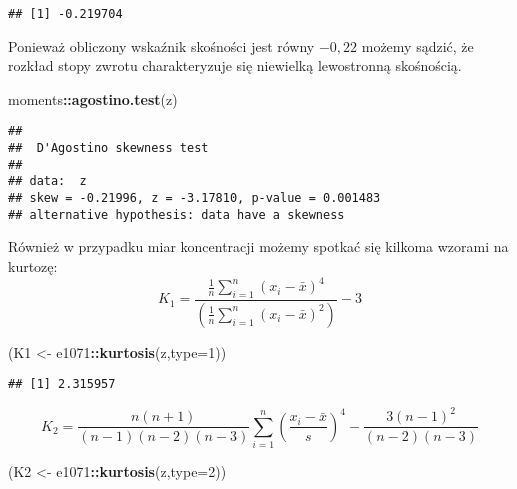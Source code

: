 \documentclass[polish,]{book}
\newenvironment{Shaded}{\begin{snugshade}}{\end{snugshade}}
\newcommand{\DataTypeTok}[1]{\textcolor[rgb]{0.13,0.29,0.53}{#1}}
\newcommand{\DecValTok}[1]{\textcolor[rgb]{0.00,0.00,0.81}{#1}}
\newcommand{\KeywordTok}[1]{\textcolor[rgb]{0.13,0.29,0.53}{\textbf{#1}}}
\newcommand{\NormalTok}[1]{#1}
\newcommand{\OperatorTok}[1]{\textcolor[rgb]{0.81,0.36,0.00}{\textbf{#1}}}
\newcommand{\StringTok}[1]{\textcolor[rgb]{0.31,0.60,0.02}{#1}}
\begin{document}
\begin{verbatim}
## [1] -0.219704
\end{verbatim}

Ponieważ obliczony wskaźnik skośności jest równy \(-0,22\) możemy sądzić, że rozkład stopy zwrotu charakteryzuje się niewielką lewostronną skośnością.

\begin{Shaded}
\begin{Highlighting}[]
\NormalTok{moments}\OperatorTok{::}\KeywordTok{agostino.test}\NormalTok{(z)}
\end{Highlighting}
\end{Shaded}

\begin{verbatim}
## 
##  D'Agostino skewness test
## 
## data:  z
## skew = -0.21996, z = -3.17810, p-value = 0.001483
## alternative hypothesis: data have a skewness
\end{verbatim}

Również w przypadku miar koncentracji możemy spotkać się kilkoma wzorami
na kurtozę:
\begin{equation}
K_{1}=\frac{\frac{1}{n}\sum_{i=1}^{n}(x_i-\bar{x})^4}{\left(\frac{1}{n}\sum_{i=1}^{n}(x_i-\bar{x})^2\right)}-3
\label{eq:wz917}
\end{equation}

\begin{Shaded}
\begin{Highlighting}[]
\NormalTok{(K1 <-}\StringTok{ }\NormalTok{e1071}\OperatorTok{::}\KeywordTok{kurtosis}\NormalTok{(z,}\DataTypeTok{type=}\DecValTok{1}\NormalTok{))}
\end{Highlighting}
\end{Shaded}

\begin{verbatim}
## [1] 2.315957
\end{verbatim}

\begin{equation}
K_{2}=\frac{n(n+1)}{(n-1)(n-2)(n-3)}\sum_{i=1}^{n}\left(\frac{x_i-\bar{x}}{s}\right)^4-\frac{3(n-1)^2}{(n-2)(n-3)}
\label{eq:wz918}
\end{equation}

\begin{Shaded}
\begin{Highlighting}[]
\NormalTok{(K2 <-}\StringTok{ }\NormalTok{e1071}\OperatorTok{::}\KeywordTok{kurtosis}\NormalTok{(z,}\DataTypeTok{type=}\DecValTok{2}\NormalTok{))}
\end{Highlighting}
\end{Shaded}
\end{document}
